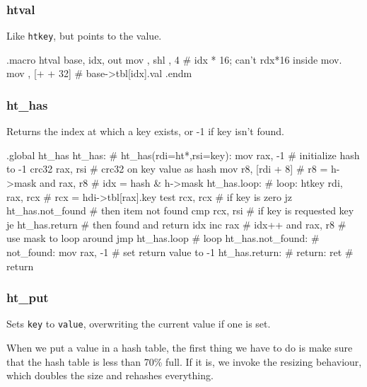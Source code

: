 \subsubsection{htval}

Like \lstinline|htkey|, but points to the value.

\begin{asm}
.macro htval base, idx, out
	mov	\out, \idx
	shl	\out, 4		# idx * 16; can't rdx*16 inside mov.
	mov	\out, [\base + \out + 32] # base->tbl[idx].val
.endm
\end{asm}

\subsubsection{ht\_has}

Returns the index at which a key exists, or -1 if key isn't found.

\begin{asm}
.global ht_has
ht_has:					    # ht_has(rdi=ht*,rsi=key):
	mov	rax, -1			    #   initialize hash to -1
	crc32	rax, rsi		    #   crc32 on key value as hash
	mov	r8, [rdi + 8]		    #   r8 = h->mask
	and	rax, r8			    #   idx = hash & h->mask
ht_has.loop:				    # loop:
	htkey	rdi, rax, rcx		    #   rcx = hdi->tbl[rax].key
	test	rcx, rcx		    #   if key is zero
	jz	ht_has.not_found	    #   then item not found
	cmp	rcx, rsi		    #   if key is requested key
	je	ht_has.return		    #   then found and return idx
	inc	rax			    #   idx++
	and	rax, r8			    #   use mask to loop around
	jmp	ht_has.loop		    #   loop
ht_has.not_found:			    # not_found:
	mov	rax, -1			    #   set return value to -1
ht_has.return:				    # return:
	ret				    #   return
\end{asm}

\subsubsection{ht\_put}

Sets \lstinline|key| to \lstinline|value|, overwriting the current value if one
is set.

When we put a value in a hash table, the first thing we have to do is make sure
that the hash table is less than 70\% full. If it is, we invoke the resizing
behaviour, which doubles the size and rehashes everything.

